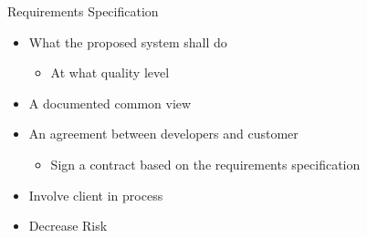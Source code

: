 \documentclass[10pt,t,a4paper]{beamer}
\begin{document}
\begin{frame}[label=sec-1-7]{Requirements Specification}
\begin{itemize}
\item What the proposed system shall do
\begin{itemize}
\item At what quality level
\end{itemize}
\item A documented common view
\item An agreement between developers and customer
\begin{itemize}
\item Sign a contract based on the requirements specification
\end{itemize}
\item Involve client in process
\item Decrease Risk
\end{itemize}
\end{frame}
\end{document}
